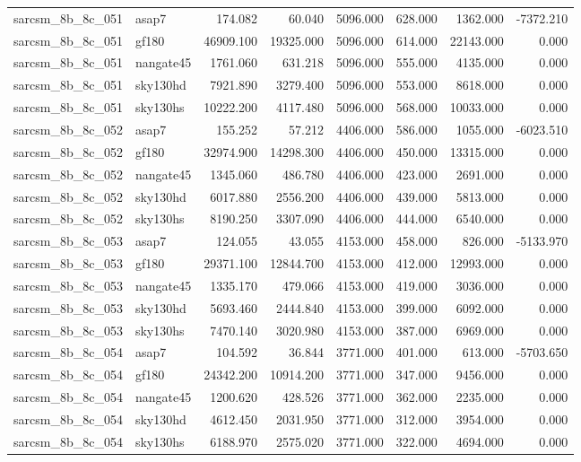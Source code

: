 \begin{tabular}{llrrrrrr}
sarcsm\_8b\_8c\_051 & asap7 & 174.082 & 60.040 & 5096.000 & 628.000 & 1362.000 & -7372.210 \\
sarcsm\_8b\_8c\_051 & gf180 & 46909.100 & 19325.000 & 5096.000 & 614.000 & 22143.000 & 0.000 \\
sarcsm\_8b\_8c\_051 & nangate45 & 1761.060 & 631.218 & 5096.000 & 555.000 & 4135.000 & 0.000 \\
sarcsm\_8b\_8c\_051 & sky130hd & 7921.890 & 3279.400 & 5096.000 & 553.000 & 8618.000 & 0.000 \\
sarcsm\_8b\_8c\_051 & sky130hs & 10222.200 & 4117.480 & 5096.000 & 568.000 & 10033.000 & 0.000 \\
sarcsm\_8b\_8c\_052 & asap7 & 155.252 & 57.212 & 4406.000 & 586.000 & 1055.000 & -6023.510 \\
sarcsm\_8b\_8c\_052 & gf180 & 32974.900 & 14298.300 & 4406.000 & 450.000 & 13315.000 & 0.000 \\
sarcsm\_8b\_8c\_052 & nangate45 & 1345.060 & 486.780 & 4406.000 & 423.000 & 2691.000 & 0.000 \\
sarcsm\_8b\_8c\_052 & sky130hd & 6017.880 & 2556.200 & 4406.000 & 439.000 & 5813.000 & 0.000 \\
sarcsm\_8b\_8c\_052 & sky130hs & 8190.250 & 3307.090 & 4406.000 & 444.000 & 6540.000 & 0.000 \\
sarcsm\_8b\_8c\_053 & asap7 & 124.055 & 43.055 & 4153.000 & 458.000 & 826.000 & -5133.970 \\
sarcsm\_8b\_8c\_053 & gf180 & 29371.100 & 12844.700 & 4153.000 & 412.000 & 12993.000 & 0.000 \\
sarcsm\_8b\_8c\_053 & nangate45 & 1335.170 & 479.066 & 4153.000 & 419.000 & 3036.000 & 0.000 \\
sarcsm\_8b\_8c\_053 & sky130hd & 5693.460 & 2444.840 & 4153.000 & 399.000 & 6092.000 & 0.000 \\
sarcsm\_8b\_8c\_053 & sky130hs & 7470.140 & 3020.980 & 4153.000 & 387.000 & 6969.000 & 0.000 \\
sarcsm\_8b\_8c\_054 & asap7 & 104.592 & 36.844 & 3771.000 & 401.000 & 613.000 & -5703.650 \\
sarcsm\_8b\_8c\_054 & gf180 & 24342.200 & 10914.200 & 3771.000 & 347.000 & 9456.000 & 0.000 \\
sarcsm\_8b\_8c\_054 & nangate45 & 1200.620 & 428.526 & 3771.000 & 362.000 & 2235.000 & 0.000 \\
sarcsm\_8b\_8c\_054 & sky130hd & 4612.450 & 2031.950 & 3771.000 & 312.000 & 3954.000 & 0.000 \\
sarcsm\_8b\_8c\_054 & sky130hs & 6188.970 & 2575.020 & 3771.000 & 322.000 & 4694.000 & 0.000 \\

\end{tabular}

